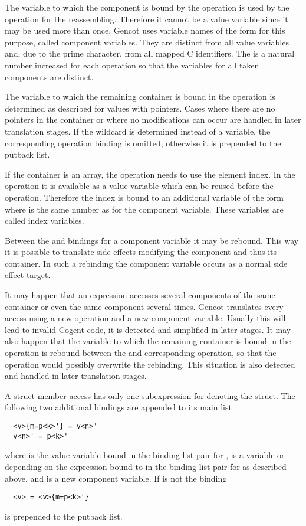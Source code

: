 The variable to which the component is bound by the  operation is used by the  operation for the 
reassembling. Therefore it cannot be a value variable since it may be used more than once. Gencot uses variable names 
of the form  for this purpose, called component variables. They are distinct from all value variables and, 
due to the prime character, from all mapped C identifiers. The  is a natural number increased for each 
operation so that the variables for all taken components are distinct.

The variable to which the remaining container is bound in the  operation is determined as described for values 
with pointers. Cases where there are no pointers in the container or where no modifications can occur are handled in later
translation stages. If the wildcard \code{\_} is determined instead of a variable, the corresponding  operation
binding is omitted, otherwise it is prepended to the putback list.

If the container is an array, the  operation needs to use the element index. In the  operation it is
available as a value variable which can be reused before the  operation. Therefore the index is bound to an 
additional variable of the form  where  is the same number as for the component variable. These
variables are called index variables.

Between the  and  bindings for a component variable it may be rebound. This way it is possible to translate
side effects modifying the component and thus its container. In such a rebinding the component variable occurs as a normal side
effect target.

It may happen that an expression accesses several components of the same container or even the same component several times.
Gencot translates every access using a new  operation and a new component variable. Usually this will lead to 
invalid Cogent code, it is detected and simplified in later stages. It may also happen that the variable to which the remaining 
container is bound in the  operation is rebound between the  and corresponding  operation,
so that the  operation would possibly overwrite the rebinding. This situation is also detected and handled in 
later translation stages.

A struct member access  has only one subexpression  for denoting the struct. The following two additional 
bindings are appended to its main list
\begin{verbatim}
  <v>{m=p<k>'} = v<n>'
  v<n>' = p<k>'
\end{verbatim}
where  is the value variable bound in the binding list pair for ,  is a variable or \code{\_} 
depending on the expression bound to  in the binding list pair for  as described above, and  
is a new component variable. If  is not \code{\_} the binding
\begin{verbatim}
  <v> = <v>{m=p<k>'}
\end{verbatim}
is prepended to the putback list.

